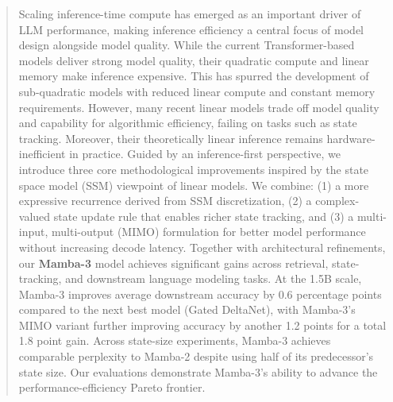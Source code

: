 \begin{abstract}
\noindent 
Scaling inference-time compute has emerged as an important driver of LLM performance, making inference efficiency a central focus of model design alongside model quality.
While the current Transformer-based models deliver strong model quality, their quadratic compute and linear memory make inference expensive.
This has spurred the development of sub-quadratic models with reduced linear compute and constant memory requirements.
However, many recent linear models trade off model quality and capability for algorithmic efficiency, failing on tasks such as state tracking. Moreover, their theoretically linear inference remains hardware-inefficient in practice.
Guided by an inference-first perspective, we introduce three core methodological improvements inspired by the state space model (SSM) viewpoint of linear models.
We combine: (1) a more expressive recurrence derived from SSM discretization, (2) a complex-valued state update rule that enables richer state tracking, and (3) a multi-input, multi-output (MIMO) formulation for better model performance without increasing decode latency. 
Together with architectural refinements, our \textbf{Mamba-3} model achieves significant gains across retrieval, state-tracking, and downstream language modeling tasks.
At the 1.5B scale, Mamba-3 improves average downstream accuracy by 0.6 percentage points compared to the next best model (Gated DeltaNet), with Mamba-3's MIMO variant further improving accuracy by another 1.2 points for a total 1.8 point gain.
Across state-size experiments, Mamba-3 achieves comparable perplexity to Mamba-2 despite using half of its predecessor's state size.
Our evaluations demonstrate Mamba-3's ability to advance the performance-efficiency Pareto frontier.
\end{abstract}

